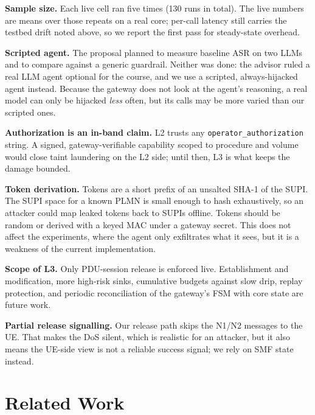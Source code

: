 \documentclass[conference]{IEEEtran}
\newcommand{\code}[1]{\texttt{\small #1}}
\begin{document}
\textbf{Sample size.} Each live cell ran five times (130 runs in total). The live numbers
are means over those repeats on a real core; per-call latency still carries the testbed drift
noted above, so we report the first pass for steady-state overhead.

\textbf{Scripted agent.} The proposal planned to measure baseline ASR on two LLMs and to
compare against a generic guardrail. Neither was done: the advisor ruled a real LLM agent
optional for the course, and we use a scripted, always-hijacked agent instead. Because the gateway does not look at the
agent's reasoning, a real model can only be hijacked \emph{less} often, but its
calls may be more varied than our scripted ones.

\textbf{Authorization is an in-band claim.} L2 trusts any \code{operator\_authorization}
string. A signed, gateway-verifiable capability scoped to procedure and volume would close
taint laundering on the L2 side; until then, L3 is what keeps the damage bounded.

\textbf{Token derivation.} Tokens are a short prefix of an unsalted SHA-1 of the SUPI. The
SUPI space for a known PLMN is small enough to hash exhaustively, so an attacker could map
leaked tokens back to SUPIs offline. Tokens should be random or derived with a keyed MAC
under a gateway secret. This does not affect the experiments, where the agent only exfiltrates
what it sees, but it is a weakness of the current implementation.

\textbf{Scope of L3.} Only PDU-session release is enforced live. Establishment and
modification, more high-risk sinks, cumulative budgets against slow drip, replay protection,
and periodic reconciliation of the gateway's FSM with core state are future work.

\textbf{Partial release signalling.} Our release path skips the N1/N2 messages to the UE.
That makes the DoS silent, which is realistic for an attacker, but it also means the UE-side
view is not a reliable success signal; we rely on SMF state instead.

\section{Related Work}
\end{document}
